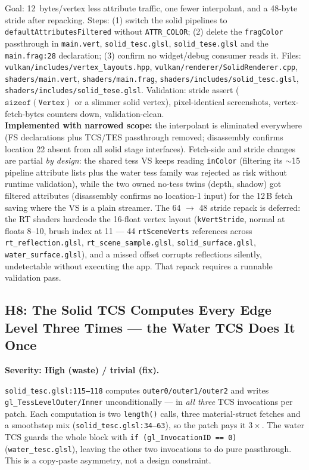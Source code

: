 \documentclass[11pt,a4paper]{article}
\begin{document}
\begin{tcolorbox}[promptbox={Prompt --- H7: remove the dead color attribute}]
Goal: 12~bytes/vertex less attribute traffic, one fewer interpolant, and a
48-byte stride after repacking. Steps: (1) switch the solid pipelines to
\texttt{defaultAttributesFiltered} without \texttt{ATTR\_COLOR}; (2) delete the \texttt{fragColor} passthrough in
\texttt{main.vert}, \texttt{solid\_tesc.glsl}, \texttt{solid\_tese.glsl} and
the \texttt{main.frag:28} declaration; (3) confirm no widget/debug consumer
reads it. Files: \texttt{vulkan/includes/vertex\_layouts.hpp},
\texttt{vulkan/renderer/SolidRenderer.cpp}, \texttt{shaders/main.vert},
\texttt{shaders/main.frag}, \texttt{shaders/includes/solid\_tesc.glsl},
\texttt{shaders/includes/solid\_tese.glsl}. Validation: stride assert
($\mathtt{sizeof(Vertex)}$ or a slimmer solid vertex), pixel-identical
screenshots, vertex-fetch-bytes counters down, validation-clean.
\\ \textbf{Implemented with narrowed scope:} the interpolant is eliminated
everywhere (FS declarations plus TCS/TES passthrough removed; disassembly
confirms location 22 absent from all solid stage interfaces). Fetch-side and
stride changes are partial \emph{by design}: the shared tess VS keeps reading
\texttt{inColor} (filtering its $\sim$15 pipeline attribute lists plus the
water tess family was rejected as risk without runtime validation), while the
two owned no-tess twins (depth, shadow) got filtered attributes (disassembly
confirms no location-1 input) for the 12\,B fetch saving where the VS is a
plain streamer. The 64 $\rightarrow$ 48 stride repack is deferred: the RT
shaders hardcode the 16-float vertex layout (\texttt{kVertStride}, normal at
floats 8--10, brush index at 11 --- 44 \texttt{rtSceneVerts} references across
\texttt{rt\_reflection.glsl}, \texttt{rt\_scene\_sample.glsl},
\texttt{solid\_surface.glsl}, \texttt{water\_surface.glsl}), and a missed
offset corrupts reflections silently, undetectable without executing the app.
That repack requires a runnable validation pass.
\end{tcolorbox}

\subsection{H8: The Solid TCS Computes Every Edge Level Three Times --- the Water TCS Does It Once}
\label{sec:h8}

\textbf{Severity: High (waste) / trivial (fix).}

\texttt{solid\_tesc.glsl:115--118} computes \texttt{outer0/outer1/outer2} and
writes \texttt{gl\_TessLevelOuter/Inner} unconditionally --- in \emph{all three}
TCS invocations per patch. Each computation is two \texttt{length()} calls,
three material-struct fetches and a smoothstep mix
(\texttt{solid\_tesc.glsl:34--63}), so the patch pays it $3\times$. The water
TCS guards the whole block with \texttt{if (gl\_InvocationID == 0)}
(\texttt{water\_tesc.glsl}), leaving the other two invocations to do pure
passthrough. This is a copy-paste asymmetry, not a design constraint.
\end{document}
